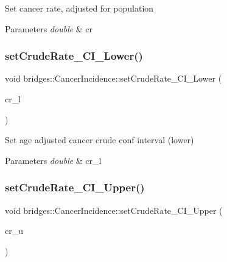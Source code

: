Set cancer rate, adjusted for population


\begin{DoxyParams}{Parameters}
{\em double} & cr \\
\hline
\end{DoxyParams}
\mbox{\label{classbridges_1_1_cancer_incidence_a58cdb11fa6e8d2766d3ef98b1e8aea1f}} 
\subsubsection{\texorpdfstring{setCrudeRate\_CI\_Lower()}{setCrudeRate\_CI\_Lower()}}
{\footnotesize\ttfamily void bridges\+::\+Cancer\+Incidence\+::set\+Crude\+Rate\+\_\+\+C\+I\+\_\+\+Lower (\begin{DoxyParamCaption}\item[{double}]{cr\+\_\+l }\end{DoxyParamCaption})\hspace{0.3cm}{\ttfamily [inline]}}

Set age adjusted cancer crude conf interval (lower)


\begin{DoxyParams}{Parameters}
{\em double} & cr\+\_\+l \\
\hline
\end{DoxyParams}
\mbox{\label{classbridges_1_1_cancer_incidence_a40d654a767d9b20ffa6931591d96d42a}} 
\subsubsection{\texorpdfstring{setCrudeRate\_CI\_Upper()}{setCrudeRate\_CI\_Upper()}}
{\footnotesize\ttfamily void bridges\+::\+Cancer\+Incidence\+::set\+Crude\+Rate\+\_\+\+C\+I\+\_\+\+Upper (\begin{DoxyParamCaption}\item[{double}]{cr\+\_\+u }\end{DoxyParamCaption})\hspace{0.3cm}{\ttfamily [inline]}}

